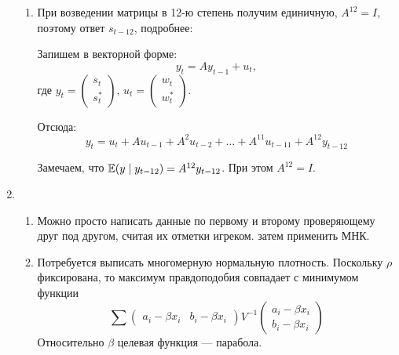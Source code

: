 \begin{enumerate}
\begin{enumerate}
    \item При возведении матрицы в 12-ю степень получим единичную, $A^{12}=I$, поэтому ответ $s_{t-12}$, подробнее:
    
    Запишем в векторной форме:
    \[
    y_t = A y_{t-1} + u_t,    
    \]
    где $y_t = \begin{pmatrix}
        s_t \\ s_t^*
    \end{pmatrix}$, $u_t = \begin{pmatrix}
        w_t \\ w_t^*
    \end{pmatrix}$.

    Отсюда:
    \[
    y_t = u_t + Au_{t-1} + A^2 u_{t-2} + \ldots + A^{11} u_{t-11} + A^{12} y_{t-12}
    \]

    Замечаем, что $\operatorname{\mathbb{E}}(y \mid y_{t-12}) = A^{12} y_{t-12}$. При этом $A^{12}=I$.

\end{enumerate}

\item \begin{enumerate}
    \item Можно просто написать данные по первому и второму проверяющему друг под другом, считая их отметки игреком. затем применить МНК.
    
    \item Потребуется выписать многомерную нормальную плотность.
    Поскольку $\rho$ фиксирована, то максимум правдоподобия совпадает с минимумом функции
    \[
       \sum \begin{pmatrix} a_i - \beta x_i & b_i - \beta x_i \end{pmatrix} V^{-1} \begin{pmatrix} a_i - \beta x_i \\ b_i - \beta x_i \end{pmatrix}
    \]
    Относительно $\beta$ целевая функция — парабола.
\end{enumerate}

        
\end{enumerate}
